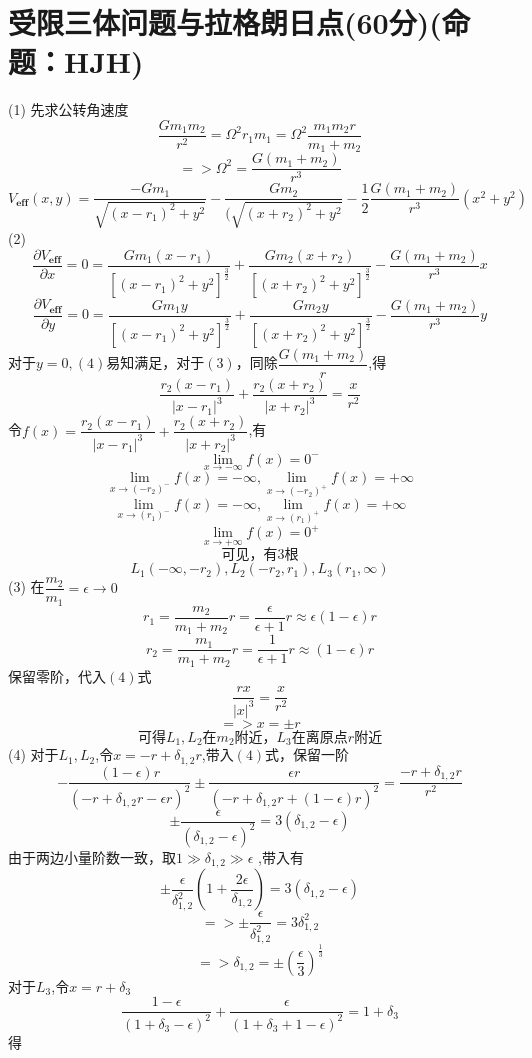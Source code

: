 \documentclass{article}
\begin{document}
\section*{受限三体问题与拉格朗日点(60分)(命题：HJH)}
\[\]
(1)
先求公转角速度
\[
\dfrac{Gm_1 m_2}{r^2}=\Omega^2 r_1 m_1=\Omega^2 \dfrac{m_1 m_2 r}{m_1 +m_2}
\]
\[
=>\Omega^2=\dfrac{G(m_1+m_2)}{r^3}\tag{1}
\]
\[
V_{\mathbf{eff}}(x,y)=
\dfrac{-Gm_1}{\sqrt{(x-r_1)^2+y^2}}
-\dfrac{Gm_2}{(\sqrt{(x+r_2)^2+y^2}}
-\dfrac{1}{2}\dfrac{G(m_1+m_2)}{r^3}(x^2+y^2)\tag{2}
\]
(2)
\[
\dfrac{\partial V_{\mathbf{eff}}}{\partial x}
=0
=\dfrac{Gm_1(x-r_1)}{[(x-r_1)^2+y^{2}]^{\frac{3}{2}}}
+\dfrac{Gm_2(x+r_2)}{[(x+r_2)^2+y^{2}]^{\frac{3}{2}}}
-\dfrac{G(m_1+m_2)}{r^3}x
\tag{3}
\]
\[
\dfrac{\partial V_{\mathbf{eff}}}{\partial y}=0
=\dfrac{Gm_1 y}{[(x-r_1)^2+y^{2}]^{\frac{3}{2}}}
+\dfrac{Gm_2 y}{[(x+r_2)^2+y^{2}]^{\frac{3}{2}}}
-\dfrac{G(m_1+m_2)}{r^3}y
\tag{4}
\]
对于$y=0,(4)$易知满足，对于$(3)$，同除$\dfrac{G(m_1+m_2)}{r}$,得
\[
 \dfrac{r_2(x-r_1)}{|x-r_1|^3}
+\dfrac{r_2(x+r_2)}{|x+r_2|^3}
=\dfrac{x}{r^2}\tag{3'}
\]
令$f(x)=\dfrac{r_2(x-r_1)}{|x-r_1|^3}+\dfrac{r_2(x+r_2)}{|x+r_2|^3}$,有
\[
\lim_{x \to -\infty}f(x)=0^-\tag{5}
\]
\[
\lim_{x \to (-r_2)^-}f(x)=-\infty,\lim_{x \to (-r_2)^+}f(x)=+\infty\tag{6}
\]
\[
\lim_{x \to (r_1)^-}f(x)=-\infty,\lim_{x \to (r_1)^+}f(x)=+\infty\tag{7}
\]
\[
\lim_{x \to +\infty}f(x)=0^+\tag{8}
\]
\[可见，有3根\tag{9}\]
\[L_1(-\infty,-r_2),L_2(-r_2,r_1),L_3(r_1,\infty)\tag{10}\]
(3)
在$\dfrac{m_2}{m_1}=\epsilon\to 0$
\[
r_1=\dfrac{m_2}{m_1+m_2}r=\dfrac{\epsilon}{\epsilon+1}r\approx \epsilon(1-\epsilon)r\tag{11}
\]
\[
r_2=\dfrac{m_1}{m_1+m_2}r=\dfrac{1}{\epsilon+1}r\approx (1-\epsilon)r\tag{12}
\]
保留零阶，代入$(4)$式
\[
\dfrac{rx}{|x|^3}=\dfrac{x}{r^2}\tag{13}
\]
\[
=>x=\pm r\tag{14}
\]
\[
可得L_1,L_2在m_2附近，L_3在离原点r附近\tag{15}
\]
(4)
对于$L_1,L_2$,令$x=-r+\delta_{1,2}r$,带入$(4)$式，保留一阶
\[
-\dfrac{(1-\epsilon)r}{(-r+\delta_{1,2}r-\epsilon r)^2}
\pm 
\dfrac{\epsilon r}{(-r + \delta_{1,2} r +(1-\epsilon)r)^2}=\dfrac{-r+\delta_{1,2}r}{r^2}\tag{16}
\]
\[
\pm \dfrac{\epsilon}{(\delta_{1,2}-\epsilon)^2}=3(\delta_{1,2}-\epsilon)
\]
由于两边小量阶数一致，取$1\gg\delta_{1,2}\gg\epsilon$ ,带入有
\[
\pm \dfrac{\epsilon}{\delta_{1,2}^2}\left(1+\dfrac{2\epsilon}{\delta_{1,2}}\right)=3(\delta_{1,2}-\epsilon)
\]
\[
=>\pm  \dfrac{\epsilon}{\delta_{1,2}^2}=3 \delta_{1,2}^2
\]
\[
=>\delta_{1,2}= \pm \left(\dfrac{\epsilon}{3}\right)^{\frac{1}{3}}\tag{17}
\]
对于$L_3$,令$x=r+\delta_3$
\[
\dfrac{1-\epsilon}{(1+\delta_3-\epsilon)^2}+\dfrac{\epsilon}{(1+\delta_3+1-\epsilon)^2}=1+\delta_3\tag{18}
\]
得
\end{document}
